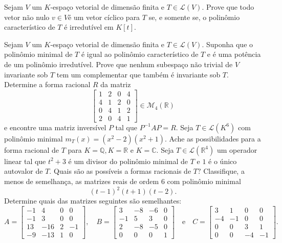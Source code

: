 \documentclass[11pt,a4paper]{article}
\begin{document}

 Sejam $V$ um $K$-espaço vetorial de dimensão finita e $T \in \mathcal{L}(V).$ Prove que todo vetor não
nulo $v \in V $é um vetor cíclico para $T$ se, e somente se, o polinômio característico de $T$ é irredutível em $K[t].$

\solucao{}

 Sejam $V$ um $K$-espaço vetorial de dimensão finita e $T \in \mathcal{L}(V).$ Suponha que o polinômio
minimal de $T$ é igual ao polinômio característico de $T$ e é uma potência de um polinômio irredutível. Prove que nenhum subespaço não trivial de $V$ invariante sob $T$ tem um complementar que também é invariante sob $T.$  
            \solucao{}
     Determine a forma racional $R$ da matriz
    \[
    \begin{bmatrix}
    1 & 2 & 0 & 4\\
    4 & 1 & 2 & 0 \\
    0 & 4 & 1 & 2 \\
    2 & 0 & 4 & 1
    \end{bmatrix} \in \mathcal{M}_4(\mathbb{R})
    \]
e encontre uma matriz inversível $P$ tal que $P^{-1}AP = R.$    
        \solucao{}
     Seja $T \in \mathcal{L}(K^6)$ com polinômio minimal $m_T(x) = (x^2 - 2)(x^2 + 1).$ Ache as possibilidades para a forma racional de $T$ para $K = \mathbb{Q}, K = \mathbb{R}$ e $K = \mathbb{C}.$   
            \solucao{}
     Seja $T \in \mathcal{L}(\mathbb{R}^4)$ um operador linear tal que $t^2 + 3$ é um divisor do polinômio minimal de $T$
e $1$ é o único autovalor de $T.$ Quais são as possíveis a formas racionais de $T?$               \solucao{}
     Classifique, a menos de semelhança, as matrizes reais de ordem $6$ com polinômio minimal
\[(t - 1)^2(t + 1)(t - 2). \]
                 \solucao{}
     Determine quais das matrizes seguintes são semelhantes:
\[
A  =\begin{bmatrix}
-1 & 4 & 0 & 0\\
-1 & 3 & 0 & 0 \\
13 & -16 & 2 & -1 \\
-9 & -13 & 1 & 0
\end{bmatrix}, \quad B  =\begin{bmatrix}
3 & -8 & -6 & 0\\
-1 &5 & 3 & 0 \\
2 & -8 & -5& 0 \\
0 & 0 & 0 & 1
\end{bmatrix} \quad \mbox{e} \quad C  =\begin{bmatrix}
3 & 1 & 0& 0\\
-4 &-1 & 0 & 0 \\
0 & 0 & 3& 1 \\
0 & 0 & -4 & -1
\end{bmatrix}.
\]
\end{document}
